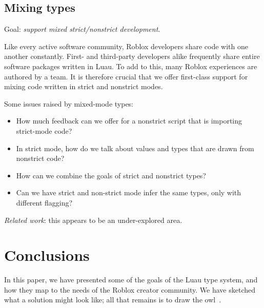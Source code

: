 \documentclass[acmsmall]{acmart}
\begin{document}
\subsection{Mixing types}

Goal: \emph{support mixed strict/nonstrict development}.

Like every active software community, Roblox developers share code
with one another constantly.  First- and third-party developers alike
frequently share entire software packages written in Luau.  To add to
this, many Roblox experiences are authored by a team.
It is therefore crucial that we offer first-class support for mixing
code written in strict and nonstrict modes.

Some issues raised by mixed-mode types:
\begin{itemize}

\item How much feedback can we offer for a nonstrict script that is
  importing strict-mode code?

\item In strict mode, how do we talk about values and types that are
  drawn from nonstrict code?

\item How can we combine the goals of strict and nonstrict types?

\item Can we have strict and non-strict mode infer the same types,
  only with different flagging?

\end{itemize}
\emph{Related work}: this appears to be an under-explored area.

\section{Conclusions}

In this paper, we have presented some of the goals of the Luau type
system, and how they map to the needs of the Roblox creator
community. We have sketched what a solution might look like; all that
remains is to draw the owl~\cite{HowToDrawAnOwl}.

 
\end{document}
